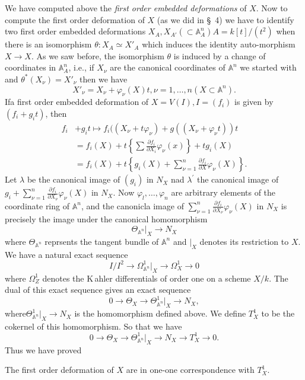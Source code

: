{We have computed above the {\em first order embedded deformations} of
$X$. Now to compute the first order deformation of $X$ (as we did
in \S\ 4) we have to identify two first order embedded deformations
$X_A, X_{A'}(\subset \mathbb{A}^{n}_{A})A=k[t]/(t^{2})$ when there is
an isomorphism $\theta:X_A \simeq X'_A$ which induces the identity
auto-morphism $X\to X$. As we saw before, the isomorphism $\theta$ is
induced by a change of coordinates in $\mathbb{A}^{n}_A$, i.e., if
$X_{\nu}$ are the canonical coordinates of $\mathbb{A}^{n}$ we started
with and $\theta^{\ast}(X_{\nu})=X'_{\nu}$ then we have 
$$
X'_{\nu}=X_{\nu}+\varphi_{\nu}(X)t, \nu=1,\ldots,n(X\subset \mathbb{A}^{n}).
$$
If\pageoriginale a first order embedded deformation of $X=V(I),
I=(f_i)$ is given by $(f_i+g_it)$, then  
\begin{align*}
f_i&+g_it\mapsto f_i((X_{\nu}+t\varphi_{\nu})+g((X_{\nu}+\varphi_{\nu}t))t\\
  &=f_i(X)+t\left\{\sum\frac{\partial f_{i}}{\partial X_i}\varphi_{\nu}(x)\right\}+tg_i(X)\\
 &=f_i(X)+t\left\{g_i(X)+\sum\limits_{\nu=1}^{n}\frac{\partial
  f_i}{\partial X}\varphi_{\nu}(X)\right\}. 
\end{align*}
Let $\lambda$ be the canonical image of $(g_i)$ in $N_X$ nad
$\lambda^{'}$ the canonical image of
$g_i+\sum\limits_{\nu=1}^{n}\frac{\partial f_i}{\partial
X_{\nu}}\varphi_{\nu}(X)$ in $N_X$. Now $\varphi_l,\ldots,\varphi_n$
are arbitrary elements of the coordinate ring of $\mathbb{A}^{n}$, and
the canonicla image of $\sum\limits_{\nu=1 }^{n}\frac{\partial
f_i}{\partial X_{\nu}}\varphi_{\nu}(X)$ in $N_X$ is precisely the
image under the canonical homomorphism 
$$
\Theta_{\mathbb{A}^{n}}\big |_{X}\to N_X
$$
where $\Theta_{\mathbb{A}^{n}}$ reprsents the tangent bundle of
$\mathbb{A}^{n}$ and $\big |_{X}$ denotes its restriction to $X$. We
have a natural exact sequence 
$$
I/I^{2}\to \Omega_{\mathbb{A}^{n}}^{1}\big |_{X}\to\Omega^{1}_{X}\to 0
$$ 
where $\Omega^{1}_{Z}$ denotes the K\,{a}hler differentials of order
one on a scheme $X/k$. The dual of this exact sequence gives an exact
sequence 
$$
0\to \Theta_X\to \Theta_{\mathbb{A}^{n}}^{1}\big |_{X}\to N_{X},
$$
where\pageoriginale $\Theta_{\mathbb{A}^{n}}^{1}\big |_{X}\to N_X$ is
the homomorphism defined above. We define $T_{X}^{1}$ to be the
cokernel of this homomorphism. So that we have 
$$
0\to\Theta_{X}\to \Theta_{\mathbb{A}^{n}}^{1}\big |_{X}\to N_X\to T_{X}^{1}\to 0.
$$
Thus we have proved


\begin{theorem}\label{part1-thm6.2}%
The first order deformation of $X$ are in one-one correspondence with $T^{1}_X$.
\end{theorem}

}
